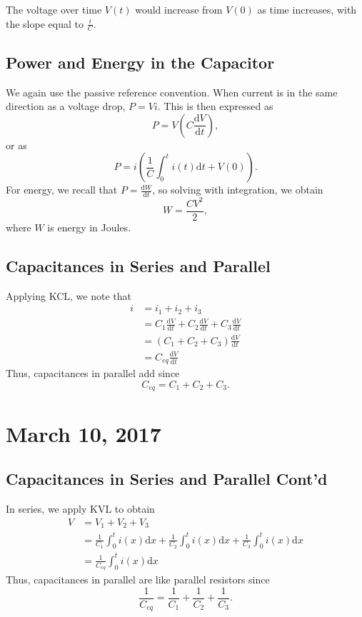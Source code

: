 \documentclass[11pt]{article}
\theoremstyle{plain} %
\theoremstyle{definition}
\theoremstyle{example}
\theoremstyle{remark}
\begin{document}
The voltage over time $V(t)$ would increase from $V(0)$ as time increases, with the slope equal to $\frac{i}{C}$. 

\subsection{Power and Energy in the Capacitor}

We again use the passive reference convention. When current is in the same direction as a voltage drop, $P=Vi$. This is then expressed as 
$$P = V\left(C\frac{\mathrm d V}{\mathrm d t}\right),$$
or as 
$$P = i\left(\frac{1}{C}\int_0^ti(t)\mathrm d t + V(0)\right).$$
For energy, we recall that $P = \frac{\mathrm d W}{\mathrm d t}$, so solving with integration, we obtain 
$$W = \frac{CV^2}{2},$$
where $W$ is energy in Joules. 

\subsection{Capacitances in Series and Parallel}

Applying KCL, we note that 
\begin{align*}
	i &= i_1+i_2+i_3\\
		&= C_1\frac{\mathrm d V}{\mathrm d t}+ C_2\frac{\mathrm d V}{\mathrm d t}+ C_3\frac{\mathrm d V}{\mathrm d t}\\
		&= (C_1+C_2+C_3)\frac{\mathrm d V}{\mathrm d t}\\
		&= C_{eq}\frac{\mathrm d V}{\mathrm d t}
\end{align*}
Thus, capacitances in parallel add since 
$$C_{eq} = C_1+C_2+C_3.$$

\section{March 10, 2017}
\subsection{Capacitances in Series and Parallel Cont'd}

In series, we apply KVL to obtain 
\begin{align*}
	V &= V_1+V_2+V_3\\
	&= \frac{1}{C_1}\int_0^ti(x)\mathrm d x + \frac{1}{C_2}\int_0^ti(x)\mathrm d x+\frac{1}{C_3}\int_0^ti(x)\mathrm d x\\
	&= \frac{1}{C_{eq}}\int_0^ti(x)\mathrm d x
\end{align*}
Thus, capacitances in parallel are like parallel resistors since 
$$\frac{1}{C_{eq}} = \frac{1}{C_1} + \frac{1}{C_2} + \frac{1}{C_3}.$$
\end{document}

